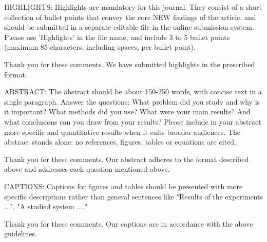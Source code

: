\documentclass[answers,11pt]{exam}
\begin{document}
\begin{questions}
 \question  
 
HIGHLIGHTS: Highlights are mandatory for this journal. They consist of a short collection of bullet points that convey the core NEW findings of the article, and should be submitted in a separate editable file in the online submission system. Please use 'Highlights' in the file name, and include 3 to 5 bullet points (maximum 85 characters, including spaces, per bullet point).       

 \begin{solution}
                Thank you for these comments. We have submitted highlights in the prescribed format.
                
        \end{solution}

 

 \question  
 
ABSTRACT: The abstract should be about 150-250 words, with concise text in a single paragraph. Answer the questions: What problem did you study and why is it important? What methods did you use? What were your main results? And what conclusions can you draw from your results? Please include in your abstract more specific and quantitative results when it suits broader audiences. The abstract stands alone: no references, figures, tables or equations are cited.     

 \begin{solution}
                Thank you for these comments. Our abstract adheres to the format described above and addresses each question mentioned above.
                
        \end{solution}

 
 \question  
 
CAPTIONS: Captions for figures and tables should be presented with more specific descriptions rather than general sentences like "Results of the experiments ...", "A studied system ...." 

 \begin{solution}
                Thank you for these comments. Our captions are in accordance with the above guidelines.
                
        \end{solution}

      \question  
 

\end{questions}
\end{document}
